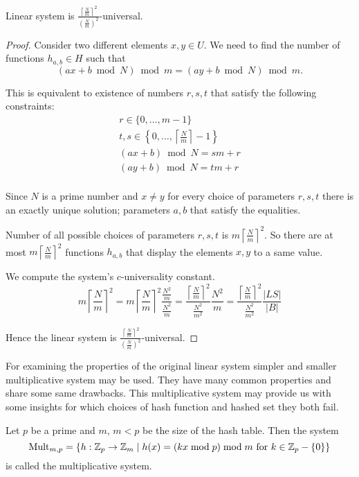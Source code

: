 \begin{remark}
Linear system is $\frac{\left\lceil \frac{N}{m} \right\rceil ^ 2}{\left(\frac{N}{m}\right) ^ 2}$-universal.
\end{remark}
\begin{proof}
Consider two different elements $x, y \in U$. We need to find the number of functions $h_{a, b} \in H$ such that 
\[ (ax + b \bmod N) \bmod m = (ay + b \bmod N) \bmod m \textit{.} \]

This is equivalent to existence of numbers $r, s, t$ that satisfy the following constraints:
\begin{gather*}
r \in \{0, \dots, m - 1 \} \\
t, s \in \left\{ 0, \dots, \left \lceil \frac{N}{m} \right \rceil - 1 \right\} \\
(ax + b) \bmod N = s m + r \\
(ay + b) \bmod N = t m + r \\
\end{gather*}

Since $N$ is a prime number and $x \neq y$ for every choice of parameters $r, s, t$ there is an exactly unique solution; parameters $a, b$ that satisfy the equalities.

Number of all possible choices of parameters $r, s, t$ is $m \left \lceil \frac{N}{m} \right \rceil ^ 2$. So there are at most $m \left \lceil \frac{N}{m} \right \rceil ^ 2$ functions $h_{a, b}$ that display the elements $x, y$ to a same value.

We compute the system's $c$-universality constant.
\[
m \left \lceil \frac{N}{m} \right \rceil ^ 2 = 
m \left \lceil \frac{N}{m} \right \rceil ^ 2 \frac{\frac{N ^ 2}{m}}{\frac{N ^ 2}{m}} = 
\frac{\left \lceil \frac{N}{m} \right \rceil ^ 2}{\frac{N ^ 2}{m ^ 2}} \frac{N ^ 2}{m} = 
\frac{\left \lceil \frac{N}{m} \right \rceil ^ 2}{\frac{N ^ 2}{m ^ 2}} \frac{|LS|}{|B|}
\]

Hence the linear system is $\frac{\left \lceil \frac{N}{m} \right \rceil ^ 2}{\left(\frac{N}{m}\right) ^ 2}$-universal.
\end{proof}

For examining the properties of the original linear system simpler and smaller multiplicative system may be used. They have many common properties and share some same drawbacks. This multiplicative system may provide us with some insights for which choices of hash function and hashed set they both fail.

\begin{definition}
Let $p$ be a prime and $m$, $m < p$ be the size of the hash table. Then the system \[ \mathrm{Mult}_{m, p} = \lbrace h:\mathbb{Z}_p \rightarrow \mathbb{Z}_m \mid h(x) = (kx \bmod p) \bmod m \text{ for } k \in \mathbb{Z}_p - \{0\} \rbrace \] is called the multiplicative system.
\end{definition}

